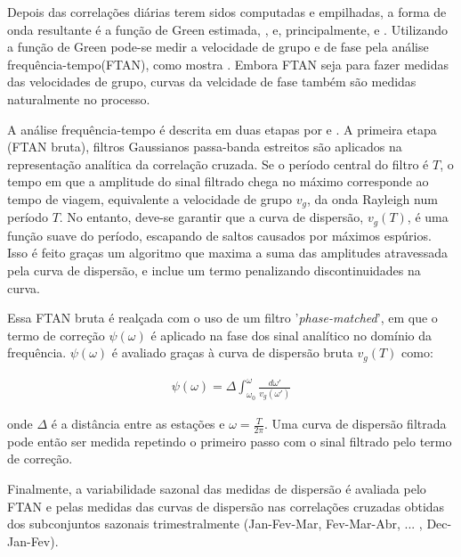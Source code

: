 Depois das correlações diárias terem sidos computadas e empilhadas, a forma de onda resultante é a função de Green estimada, \cite{campillo_long-range_2003}, \cite{shapiro_emergence_2004} e, principalmente, \cite{wapenaar_retrieving_2004} e \cite{bensen_processing_2007}. Utilizando a função de Green pode-se medir a velocidade de grupo e de fase pela análise frequência-tempo(FTAN), como mostra \cite{levshin_automated_2001}. Embora FTAN seja para fazer medidas das velocidades de grupo, curvas da velcidade de fase também são medidas naturalmente no processo.

A análise frequência-tempo é descrita em duas etapas por \cite{levshin_automated_2001} e \cite{bensen_processing_2007}. A primeira etapa (FTAN bruta), filtros Gaussianos passa-banda estreitos são aplicados na representação analítica da correlação cruzada. Se o período central do filtro é $T$, o tempo em que a amplitude do sinal filtrado chega no máximo corresponde ao tempo de viagem, equivalente a velocidade de grupo $v_{g}$, da onda Rayleigh num período $T$. No entanto, deve-se garantir que a curva de dispersão, $v_{g}(T)$, é uma função suave do período, escapando de saltos causados por máximos espúrios. Isso é feito graças um algoritmo que maxima a suma das amplitudes atravessada pela curva de dispersão, e inclue um termo penalizando discontinuidades na curva.

Essa FTAN bruta é realçada com o uso de um filtro '\textit{phase-matched}', em que o termo de correção $\psi(\omega)$ é aplicado na fase dos sinal analítico no domínio da frequência. $\psi(\omega)$ é avaliado graças à curva de dispersão bruta $v_{g}(T)$ como:

\begin{eqnarray}
\psi(\omega) = \Delta \int_{\omega_{0}}^{\omega} \frac{{d\omega}'}{v_{g}({\omega}')}
\end{eqnarray}

onde $\Delta$ é a distância entre as estações e $\omega = \frac{T}{2\pi}$. Uma curva de dispersão filtrada pode então ser medida repetindo o primeiro passo com o sinal filtrado pelo termo de correção.

Finalmente, a variabilidade sazonal das medidas de dispersão é avaliada pelo FTAN e pelas medidas das curvas de dispersão nas correlações cruzadas obtidas dos subconjuntos sazonais trimestralmente (Jan-Fev-Mar, Fev-Mar-Abr, ... , Dec-Jan-Fev). 

